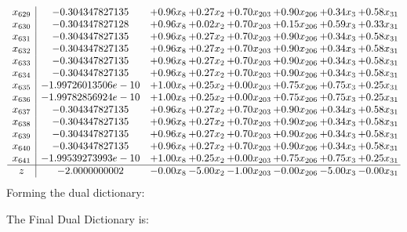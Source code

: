 \documentclass[8pt]{article}
\begin{document}
\[\begin{array}{c| c c@{\hskip 2pt} c@{\hskip 2pt} c@{\hskip 2pt} c@{\hskip 2pt} c@{\hskip 2pt} c@{\hskip 2pt} }
 x_{629}   &  -0.304347827135 & +  0.96 x_{8} & +  0.27 x_{2} & +  0.70 x_{203} & +  0.90 x_{206} & +  0.34 x_{3} & +  0.58 x_{31}\\
 x_{630}   &  -0.304347827128 & +  0.96 x_{8} & +  0.02 x_{2} & +  0.70 x_{203} & +  0.15 x_{206} & +  0.59 x_{3} & +  0.33 x_{31}\\
 x_{631}   &  -0.304347827135 & +  0.96 x_{8} & +  0.27 x_{2} & +  0.70 x_{203} & +  0.90 x_{206} & +  0.34 x_{3} & +  0.58 x_{31}\\
 x_{632}   &  -0.304347827135 & +  0.96 x_{8} & +  0.27 x_{2} & +  0.70 x_{203} & +  0.90 x_{206} & +  0.34 x_{3} & +  0.58 x_{31}\\
 x_{633}   &  -0.304347827135 & +  0.96 x_{8} & +  0.27 x_{2} & +  0.70 x_{203} & +  0.90 x_{206} & +  0.34 x_{3} & +  0.58 x_{31}\\
 x_{634}   &  -0.304347827135 & +  0.96 x_{8} & +  0.27 x_{2} & +  0.70 x_{203} & +  0.90 x_{206} & +  0.34 x_{3} & +  0.58 x_{31}\\
 x_{635}   &  -1.99726013506e-10 & +  1.00 x_{8} & +  0.25 x_{2} & +  0.00 x_{203} & +  0.75 x_{206} & +  0.75 x_{3} & +  0.25 x_{31}\\
 x_{636}   &  -1.99782856924e-10 & +  1.00 x_{8} & +  0.25 x_{2} & +  0.00 x_{203} & +  0.75 x_{206} & +  0.75 x_{3} & +  0.25 x_{31}\\
 x_{637}   &  -0.304347827135 & +  0.96 x_{8} & +  0.27 x_{2} & +  0.70 x_{203} & +  0.90 x_{206} & +  0.34 x_{3} & +  0.58 x_{31}\\
 x_{638}   &  -0.304347827135 & +  0.96 x_{8} & +  0.27 x_{2} & +  0.70 x_{203} & +  0.90 x_{206} & +  0.34 x_{3} & +  0.58 x_{31}\\
 x_{639}   &  -0.304347827135 & +  0.96 x_{8} & +  0.27 x_{2} & +  0.70 x_{203} & +  0.90 x_{206} & +  0.34 x_{3} & +  0.58 x_{31}\\
 x_{640}   &  -0.304347827135 & +  0.96 x_{8} & +  0.27 x_{2} & +  0.70 x_{203} & +  0.90 x_{206} & +  0.34 x_{3} & +  0.58 x_{31}\\
 x_{641}   &  -1.99539273993e-10 & +  1.00 x_{8} & +  0.25 x_{2} & +  0.00 x_{203} & +  0.75 x_{206} & +  0.75 x_{3} & +  0.25 x_{31}\\
\hline
z    &  -2.0000000002 & -0.00 x_{8} & -5.00 x_{2} & -1.00 x_{203} & -0.00 x_{206} & -5.00 x_{3} & -0.00 x_{31}\\
\end{array}\]
Forming the dual dictionary:

The Final Dual Dictionary is: 
\end{document}
